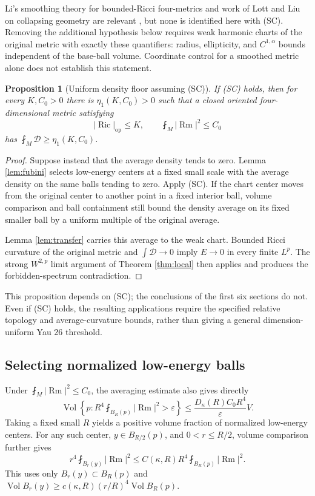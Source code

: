 \documentclass[a4paper,11pt]{article}
\theoremstyle{paper}
\newtheorem{proposition}[theorem]{Proposition}
\DeclareMathOperator{\Ric}{Ric}
\DeclareMathOperator{\Rm}{Rm}
\DeclareMathOperator{\Vol}{Vol}
\newcommand{\op}{\mathrm{op}}
\newcommand{\av}{\fint}
\newcommand{\Dcal}{\mathcal D}
\numberwithin{equation}{section}
\begin{document}
Li's smoothing theory for bounded-Ricci four-metrics and work of Lott and Liu on collapsing geometry are relevant \cite{li,lott,liu}, but none is identified here with (SC). Removing the additional hypothesis below requires weak harmonic charts of the original metric with exactly these quantifiers: radius, ellipticity, and $C^{1,\alpha}$ bounds independent of the base-ball volume. Coordinate control for a smoothed metric alone does not establish this statement.

\begin{proposition}[Uniform density floor assuming (SC)]\label{prop:conditional}
If (SC) holds, then for every $K,C_0>0$ there is $\eta_1(K,C_0)>0$ such that a closed oriented four-dimensional metric satisfying
\[
|\Ric|_{\op}\le K,\qquad\av_M|\Rm|^2\le C_0
\]
has $\av_M\Dcal\ge\eta_1(K,C_0)$.
\end{proposition}
\begin{proof}
Suppose instead that the average density tends to zero. Lemma \ref{lem:fubini} selects low-energy centers at a fixed small scale with the average density on the same balls tending to zero. Apply (SC). If the chart center moves from the original center to another point in a fixed interior ball, volume comparison and ball containment still bound the density average on its fixed smaller ball by a uniform multiple of the original average.

Lemma \ref{lem:transfer} carries this average to the weak chart. Bounded Ricci curvature of the original metric and $\int\Dcal\to0$ imply $E\to0$ in every finite $L^p$. The strong $W^{2,p}$ limit argument of Theorem \ref{thm:local} then applies and produces the forbidden-spectrum contradiction.
\end{proof}

This proposition depends on (SC); the conclusions of the first six sections do not. Even if (SC) holds, the resulting applications require the specified relative topology and average-curvature bounds, rather than giving a general dimension-uniform Yau 26 threshold.

\subsection{Selecting normalized low-energy balls}

Under $\av_M|\Rm|^2\le C_0$, the averaging estimate also gives directly
\begin{equation}\label{eq:normalized-choice}
\Vol\left\{p:R^4\av_{B_R(p)}|\Rm|^2>\varepsilon\right\}
\le\frac{D_\kappa(R)C_0R^4}{\varepsilon}V.
\end{equation}
Taking a fixed small $R$ yields a positive volume fraction of normalized low-energy centers. For any such center, $y\in B_{R/2}(p)$, and $0<r\le R/2$, volume comparison further gives
\begin{equation}\label{eq:subball}
r^4\av_{B_r(y)}|\Rm|^2
\le C(\kappa,R)R^4\av_{B_R(p)}|\Rm|^2.
\end{equation}
This uses only $B_r(y)\subset B_R(p)$ and
$\Vol B_r(y)\ge c(\kappa,R)(r/R)^4\Vol B_R(p)$.
\end{document}
